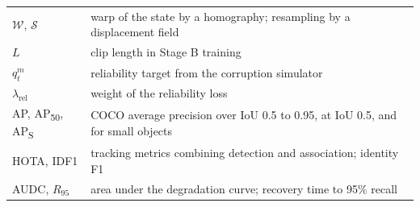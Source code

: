 {\begin{longtable}{@{}P{3.4cm}P{10.4cm}@{}}
$\mathcal{W}$, $\mathcal{S}$ & warp of the state by a homography; resampling by a displacement field \\
$L$ & clip length in Stage B training \\
$q^m_t$ & reliability target from the corruption simulator \\
$\lambda_{\text{rel}}$ & weight of the reliability loss \\
AP, AP\textsubscript{50}, AP\textsubscript{S} & COCO average precision over IoU 0.5 to 0.95, at IoU 0.5, and for small objects \\
HOTA, IDF1 & tracking metrics combining detection and association; identity F1 \\
AUDC, $R_{95}$ & area under the degradation curve; recovery time to 95\% recall \\
\end{longtable}
}

